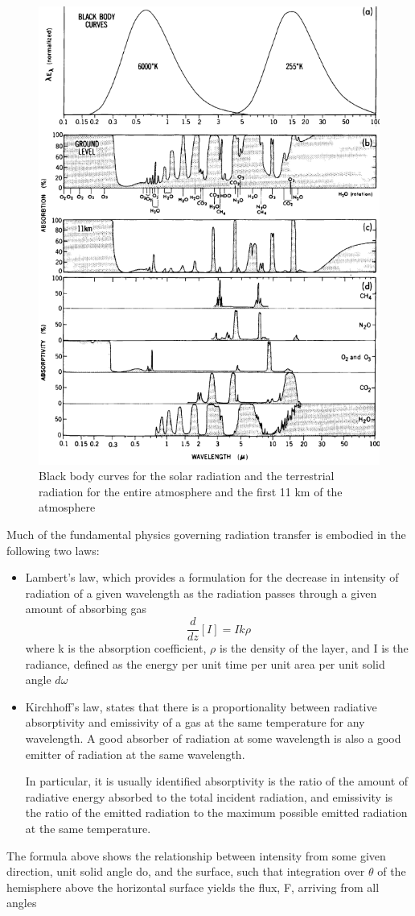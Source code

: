 \begin{figure}[h!]
	\centering
	\includegraphics[width=0.5\linewidth]{uploads/image11.png}
	\caption{Black body curves for the solar radiation and the terrestrial radiation for the entire atmosphere and the first 11 km of the atmosphere}
	\label{fig:enter-label}
\end{figure}
Much of the fundamental physics governing radiation transfer is embodied in the following two laws:
\begin{itemize}
	\item Lambert's law, which provides a formulation for the decrease in intensity of radiation of a given wavelength as the radiation passes through a given amount of absorbing gas
	      $$\frac{d}{dz}[I]=Ik\rho$$
	      where k is the absorption coefficient, $\rho$ is the density of the layer, and I is the radiance, defined as the energy per unit time per  unit area per unit solid angle $d\omega$

	\item Kirchhoff's law, states that there is a proportionality between radiative absorptivity and emissivity of a gas at the same temperature for any wavelength. A good absorber of radiation at some wavelength is also a good emitter of radiation at the same wavelength.

	      In particular, it is usually identified absorptivity is the ratio of the amount of radiative energy absorbed to the total incident radiation, and emissivity is the ratio of the emitted radiation to the maximum possible emitted radiation at the same temperature.
\end{itemize}

The formula above shows the relationship between intensity from some given direction, unit solid angle do, and the surface, such that integration over $\theta$ of the hemisphere above the horizontal surface yields the flux, F, arriving from all angles

